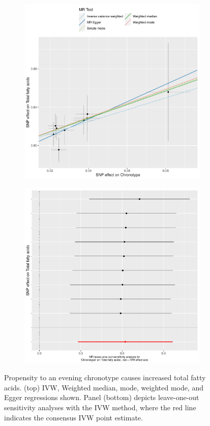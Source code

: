 \documentclass{article}
\begin{document}
%
\begin{figure}[htbp]
\begin{subfigure}{\linewidth}
\centering
	\includegraphics[width=.8\linewidth]{Figs/Analysis2/Chronotype_vs_Total_fatty_acids.Scatterplots.pdf}
\label{ffa3Scatter}
\end{subfigure}
\begin{subfigure}{\linewidth}
\centering
	\includegraphics[width=.8\linewidth,keepaspectratio]{Figs/Analysis2/Chronotype_vs_Total_fatty_acids.LOOplots.pdf}
\label{ffaLoo}
\end{subfigure}
\caption{Propensity to an evening chronotype causes increased total fatty acids. (top) IVW, Weighted median, mode, weighted mode, and Egger regressions shown. Panel (bottom) depicts leave-one-out sensitivity analyses with the IVW method, where the red line indicates the consensus IVW point estimate.}
\label{ffa}
\end{figure}
\end{document}
